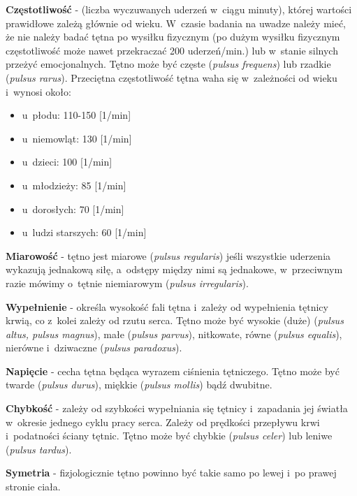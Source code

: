 \noindent \textbf{Częstotliwość} - (liczba wyczuwanych uderzeń w~ciągu minuty), której wartości prawidłowe zależą głównie od wieku. W~czasie badania na uwadze 
należy mieć, że nie należy badać tętna po wysiłku fizycznym (po dużym wysiłku fizycznym częstotliwość może nawet przekraczać 200 uderzeń/min.) lub w~stanie 
silnych przeżyć emocjonalnych. Tętno może być częste (\emph{pulsus frequens}) lub rzadkie (\emph{pulsus rarus}). Przeciętna częstotliwość tętna waha się w~zależności 
od wieku i~wynosi około:
\begin{itemize}
	\item u~płodu: 110-150 [1/min]
	\item u~niemowląt: 130 [1/min]
	\item u~dzieci: 100 [1/min]
	\item u~młodzieży: 85 [1/min]
	\item u~dorosłych: 70 [1/min]
	\item u~ludzi starszych: 60 [1/min]
\end{itemize}
\noindent \textbf{Miarowość} - tętno jest miarowe (\emph{pulsus regularis}) jeśli wszystkie uderzenia wykazują jednakową siłę, a~odstępy między nimi są jednakowe, 
w~przeciwnym razie mówimy o~tętnie niemiarowym (\emph{pulsus irregularis}).

\noindent \textbf{Wypełnienie} - określa wysokość fali tętna i~zależy od wypełnienia tętnicy krwią, co z~kolei zależy od rzutu serca. Tętno może być wysokie (duże) 
(\emph{pulsus altus, pulsus magnus}), małe (\emph{pulsus parvus}), nitkowate, równe (\emph{pulsus equalis}), nierówne i~dziwaczne (\emph{pulsus paradoxus}).

\noindent \textbf{Napięcie} - cecha tętna będąca wyrazem ciśnienia tętniczego. Tętno może być twarde (\emph{pulsus durus}), miękkie (\emph{pulsus mollis}) bądź dwubitne.

\noindent \textbf{Chybkość} - zależy od szybkości wypełniania się tętnicy i~zapadania jej światła w~okresie jednego cyklu pracy serca. Zależy od prędkości przepływu krwi 
i~podatności ściany tętnic. Tętno może być chybkie (\emph{pulsus celer}) lub leniwe (\emph{pulsus tardus}).

\noindent \textbf{Symetria} - fizjologicznie tętno powinno być takie samo po lewej i~po prawej stronie ciała.

